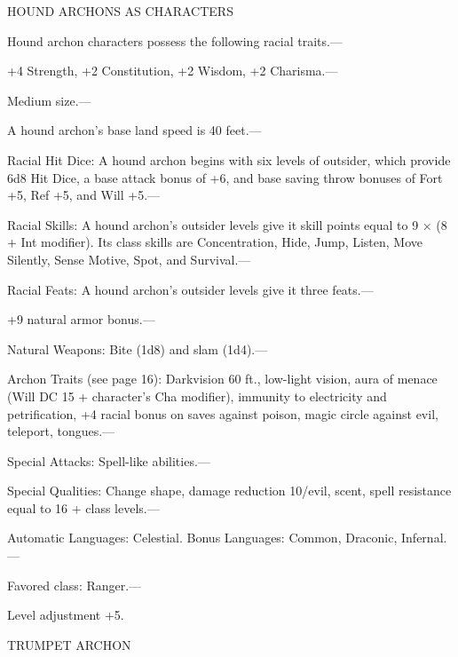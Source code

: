 \documentclass{article}
\begin{document}
\vspace{12pt}
HOUND ARCHONS AS CHARACTERS

Hound archon characters possess the following racial traits.--- 

\parindent=3pt
+4 Strength, +2 Constitution, +2 Wisdom, +2 Charisma.---

\parindent=0pt
Medium size.---

A hound archon's base land speed is 40 feet.---

Racial Hit Dice: A hound archon begins with six levels of outsider, which provide 
6d8 Hit Dice, a base attack bonus of +6, and base saving throw bonuses of Fort 
+5, Ref +5, and Will +5.---

Racial Skills: A hound archon's outsider levels give it skill points equal to 9 
\ensuremath{\times} (8 + Int modifier). Its class skills are Concentration, Hide, 
Jump, Listen, Move Silently, Sense Motive, Spot, and Survival.---

Racial Feats: A hound archon's outsider levels give it three feats.--- 

\parindent=3pt
+9 natural armor bonus.---

\parindent=0pt
Natural Weapons: Bite (1d8) and slam (1d4).---

Archon Traits (see page 16): Darkvision 60 ft., low-light vision, aura of menace 
(Will DC 15 + character's Cha modifier), immunity to electricity and petrification, 
+4 racial bonus on saves against poison, magic circle against evil, teleport, tongues.---

Special Attacks: Spell-like abilities.---

Special Qualities: Change shape, damage reduction 10/evil, scent, spell resistance 
equal to 16 + class levels.---

Automatic Languages: Celestial. Bonus Languages: Common, Draconic, Infernal.---

Favored class: Ranger.---

Level adjustment +5.

\vspace{12pt}
TRUMPET ARCHON
\end{document}
